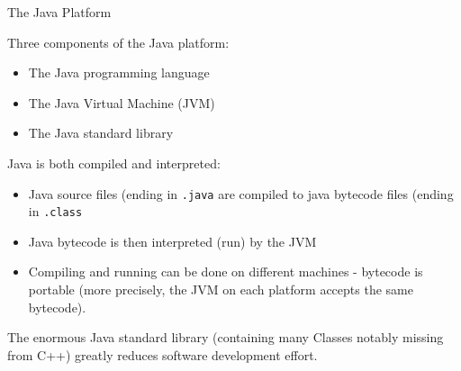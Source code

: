\documentclass{beamer}
\begin{document}
\begin{frame}[fragile]{The Java Platform}


Three components of the Java platform:
\begin{itemize}
\item The Java programming language
\item The Java Virtual Machine (JVM)
\item The Java standard library
\end{itemize}
Java is both compiled and interpreted:
\begin{itemize}
\item Java source files (ending in {\tt .java} are compiled to java
  bytecode files (ending in {\tt .class}
\item Java bytecode is then interpreted (run) by the JVM
\item Compiling and running can be done on different machines -
  bytecode is portable (more precisely, the JVM on each platform
  accepts the same bytecode).
\end{itemize}
The enormous Java standard library (containing many Classes notably
missing from C++) greatly reduces software development effort.
\end{frame}





\end{document}
